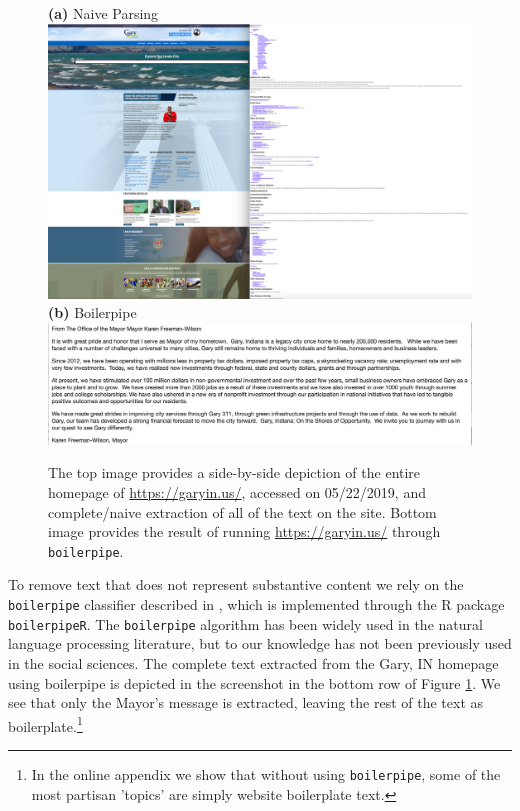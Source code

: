 \documentclass[11pt]{article}
\begin{document}
\begin{figure}
\centering
{\bf (a)} Naive Parsing  \\ \vspace{.2cm} 
\includegraphics[scale=0.35]{figures/gary_sidebyside} \\ \vspace{.4cm}
{\bf (b)} Boilerpipe 
\includegraphics[scale=0.375]{figures/gary_bp}

\caption{The top image provides a side-by-side depiction of the entire homepage of \url{https://garyin.us/}, accessed on 05/22/2019, and complete/naive extraction of all of the text on the site. Bottom image provides the result of running \url{https://garyin.us/} through \texttt{boilerpipe}.}
\label{fig:garysbs}
\end{figure}


To remove text that does not represent substantive content we rely on the \texttt{boilerpipe} classifier described in \cite{Kohlschutter2010}, which is implemented through the R package \texttt{boilerpipeR}. The \texttt{boilerpipe} algorithm has been widely used in the natural language processing literature, but to our knowledge has not been previously used in the social sciences.   The complete text extracted from the Gary, IN homepage using boilerpipe is depicted in the screenshot in the bottom row of Figure \ref{fig:garysbs}. We see that only the Mayor's message is extracted, leaving the rest of the text as boilerplate.\footnote{In the online appendix we show that without using \texttt{boilerpipe}, some of the most partisan 'topics' are simply website boilerplate text. }
\end{document}
